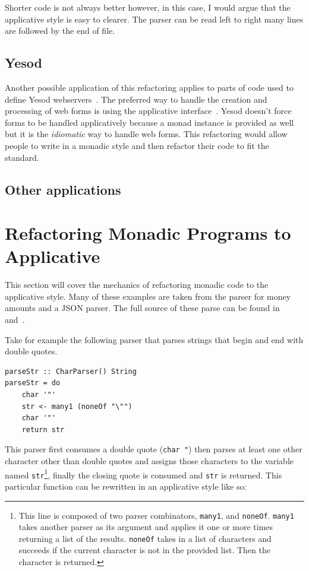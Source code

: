  Shorter code is not always better however, in this case,  I would argue that the applicative style is easy to clearer. The parser can be read left to right many lines are followed by the end of file.
 
\subsection{Yesod}
Another possible application of this refactoring applies to parts of code used to define Yesod webservers~\citep{yesod}. The preferred way to handle the creation and processing of web forms is using the applicative interface~\citep{yesodBook}. Yesod doesn't force forms to be handled applicatively because a monad instance is provided as well but it is the \textit{idiomatic} way to handle web forms. This refactoring would allow people to write in a monadic style and then refactor their code to fit the standard.

\subsection{Other applications}
  

\section{Refactoring Monadic Programs to Applicative}
\label{sec:appRefact}
This section will cover the mechanics of refactoring monadic code to the applicative style. Many of these examples are taken from the parser for money amounts and a JSON parser. The full source of these parse can be found in~\citep{moneyParse} and~\citep{jsonParser}.

Take for example the following parser that parses strings that begin and end with double quotes.

\begin{lstlisting}[frame=tlrb]
parseStr :: CharParser() String
parseStr = do
	char '"'
	str <- many1 (noneOf "\"")
	char '"'
	return str
\end{lstlisting}

This parser first consumes a double quote (\texttt{char \textquotesingle"\textquotesingle}) then parses at least one other character other than double quotes and assigns those characters to the variable named \texttt{str}\footnote{This line is composed of two parser combinators, \texttt{many1}, and \texttt{noneOf}. \texttt{many1} takes another parser as its argument and applies it one or more times returning a list of the results. \texttt{noneOf} takes in a list of characters and succeeds if the current character is not in the provided list. Then the character is returned.}, finally the closing quote is consumed and \texttt{str} is returned. This particular function can be rewritten in an applicative style like so:

